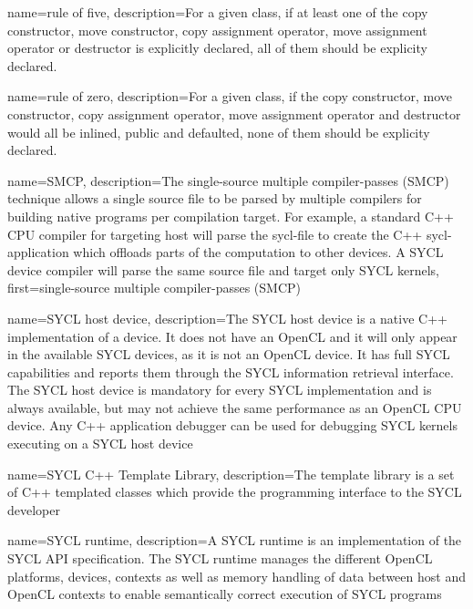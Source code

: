 {
  name={rule of five},
  description={For a given class, if at least one of the
  copy constructor, move constructor, copy assignment operator, move assignment operator or destructor
  is explicitly declared,
  all of them should be explicity declared.
  }
}

{
  name={rule of zero},
  description={For a given class, if the
  copy constructor, move constructor, copy assignment operator, move assignment operator and destructor
  would all be inlined, public and defaulted,
  none of them should be explicity declared.
  }
}

{
  name={SMCP},
  description={The single-source multiple compiler-passes (SMCP) technique allows
         a single source file to be parsed by multiple compilers for
         building native programs per compilation target.
         For example, a standard C++ CPU compiler
               for targeting \gls{host} will parse the  \gls{sycl-file} to create the
               C++ \gls{sycl-application} which offloads parts of the computation to
               other \glspl{device}. A SYCL device compiler will parse the same
               source file and target only SYCL kernels},
  first={single-source multiple compiler-passes (SMCP)}
}

{
  name={SYCL host device},
  description={The SYCL host device is a native C++
               implementation of a \gls{device}. It does not have an OpenCL
                and it will only appear in the 
               available SYCL devices, as it is not an OpenCL device. It has
               full SYCL capabilities and reports them through the SYCL 
               information retrieval interface. The SYCL host device is 
               mandatory for every SYCL implementation and is always available,
               but may not achieve the same performance as an OpenCL CPU device.
               Any C++ application debugger can be used for debugging SYCL
               kernels executing on a SYCL host device}
}

{
  name={SYCL C++ Template Library},
  description={The template library is a set of C++ templated classes which provide
               the programming interface to the SYCL developer}
}

{
  name={SYCL runtime},
  description={A SYCL runtime is an implementation of the SYCL API
               specification. The SYCL runtime manages the different OpenCL
               platforms, \glspl{device}, contexts as well as memory handling of data
               between host and OpenCL contexts to enable semantically
               correct execution of SYCL programs}
}

